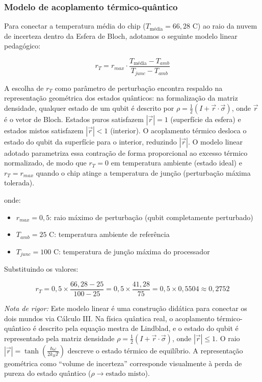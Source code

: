 \subsubsection{Modelo de acoplamento térmico-quântico}
Para conectar a temperatura média do chip ($T_{\text{média}} = 66,28$ \textdegree C) ao raio da nuvem de incerteza dentro da Esfera de Bloch, adotamos o seguinte modelo linear pedagógico:

\begin{caixamath}
    \begin{equation}
        r_T = r_{max} \cdot \frac{T_{\text{média}} - T_{amb}}{T_{junc} - T_{amb}}
    \end{equation}
\end{caixamath}

A escolha de $r_T$ como parâmetro de perturbação encontra respaldo na representação geométrica dos estados quânticos: na formalização da matriz densidade, qualquer estado de um qubit é descrito por $\rho = \frac{1}{2}(I + \vec{r} \cdot \vec{\sigma})$, onde $\vec{r}$ é o vetor de Bloch. Estados puros satisfazem $|\vec{r}| = 1$ (superfície da esfera) e estados mistos satisfazem $|\vec{r}| < 1$ (interior). O acoplamento térmico desloca o estado do qubit da superfície para o interior, reduzindo $|\vec{r}|$. O modelo linear adotado parametriza essa contração de forma proporcional ao excesso térmico normalizado, de modo que $r_T = 0$ em temperatura ambiente (estado ideal) e $r_T = r_{max}$ quando o chip atinge a temperatura de junção (perturbação máxima tolerada).

onde:
\begin{itemize}
    \item $r_{max} = 0,5$: raio máximo de perturbação (qubit completamente perturbado)
    \item $T_{amb} = 25$ \textdegree C: temperatura ambiente de referência
    \item $T_{junc} = 100$ \textdegree C: temperatura de junção máxima do processador
\end{itemize}

Substituindo os valores:
\begin{caixamath}
    \begin{equation}
        r_T = 0,5 \times \frac{66,28 - 25}{100 - 25} = 0,5 \times \frac{41,28}{75} = 0,5 \times 0,5504 \approx 0,2752
    \end{equation}
\end{caixamath}

\noindent \textit{Nota de rigor:} Este modelo linear é uma construção didática para conectar os dois mundos via Cálculo III. Na física quântica real, o acoplamento térmico-quântico é descrito pela equação mestra de Lindblad, e o estado do qubit é representado pela matriz densidade $\rho = \frac{1}{2}(I + \vec{r}\cdot\vec{\sigma})$, onde $|\vec{r}| \leq 1$. O raio $|\vec{r}| = \tanh\left(\frac{\hbar\omega}{2k_B T}\right)$ descreve o estado térmico de equilíbrio. A representação geométrica como ``volume de incerteza'' corresponde visualmente à perda de pureza do estado quântico ($\rho \rightarrow \text{estado misto}$).

